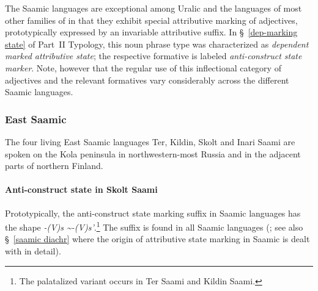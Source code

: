 The Saamic languages are exceptional among Uralic and the languages of most other families of  in that they exhibit special attributive marking of adjectives, prototypically expressed by an invariable attributive suffix. In \S~\ref{dep-marking state} of Part~II Typology, this noun phrase type was characterized as \textit{dependent marked attributive state}; the respective formative is labeled \textit{anti\hyp{}construct state marker}. Note, however that the regular use of this inflectional category of adjectives and the relevant formatives vary considerably across the different Saamic languages.

\subsubsection{East Saamic}
The four living East Saamic languages Ter, Kildin, Skolt and Inari Saami are spoken on the Kola peninsula in northwestern-most Russia and in the adjacent parts of northern Finland.

\paragraph*{Anti\hyp{}construct state in Skolt Saami}\hspace{0.4cm}
Prototypically, the anti\hyp{}construct state marking suffix in Saamic languages has the shape \textit{-(V)s \textasciitilde-(V)s'}.\footnote{The palatalized variant occurs in Ter Saami and Kildin Saami.} The suffix is found in all Saamic languages (\citealt{riesler2006b}; see also \S~\ref{saamic diachr} where the origin of attributive state marking in Saamic is dealt with in detail). 

